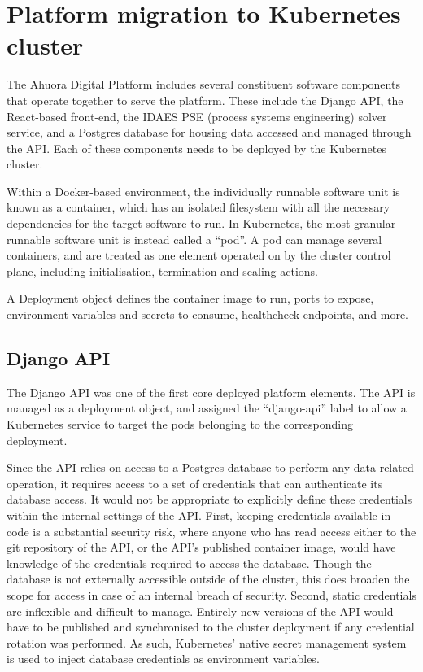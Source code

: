 \section{Platform migration to Kubernetes cluster}

The Ahuora Digital Platform includes several constituent software components that operate together to serve the platform. These include the Django API, the React-based front-end, the IDAES PSE (process systems engineering) solver service, and a Postgres database for housing data accessed and managed through the API. Each of these components needs to be deployed by the Kubernetes cluster.

Within a Docker-based environment, the individually runnable software unit is known as a container, which has an isolated filesystem with all the necessary dependencies for the target software to run. In Kubernetes, the most granular runnable software unit is instead called a ``pod''. A pod can manage several containers, and are treated as one element operated on by the cluster control plane, including initialisation, termination and scaling actions.

A Deployment object defines the container image to run, ports to expose, environment variables and secrets to consume, healthcheck endpoints, and more.

\subsection{Django API}

The Django API was one of the first core deployed platform elements. The API is managed as a deployment object, and assigned the ``django-api'' label to allow a Kubernetes service to target the pods belonging to the corresponding deployment. 

Since the API relies on access to a Postgres database to perform any data-related operation, it requires access to a set of credentials that can authenticate its database access. It would not be appropriate to explicitly define these credentials within the internal settings of the API. First, keeping credentials available in code is a substantial security risk, where anyone who has read access either to the git repository of the API, or the API's published container image, would have knowledge of the credentials required to access the database. Though the database is not externally accessible outside of the cluster, this does broaden the scope for access in case of an internal breach of security. Second, static credentials are inflexible and difficult to manage. Entirely new versions of the API would have to be published and synchronised to the cluster deployment if any credential rotation was performed. As such, Kubernetes' native secret management system is used to inject database credentials as environment variables.

